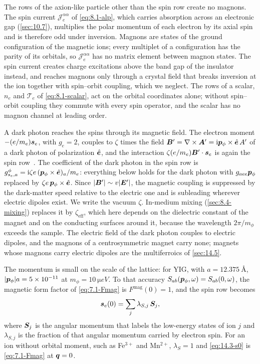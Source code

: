 The rows of the axion-like particle other than the spin row create no magnons. The spin current $\mathcal{J}^{\alpha\alpha}_e$ of \cref{eq:8.1-alp}, which carries absorption across an electronic gap (\cref{sec:10.7}), multiplies the polar momentum of each electron by its axial spin and is therefore odd under inversion. Magnons are states of the ground configuration of the magnetic ions; every multiplet of a configuration has the parity of its orbitals, so $\mathcal{J}^{\alpha\alpha}_e$ has no matrix element between magnon states. The spin current creates charge excitations above the band gap of the insulator instead, and reaches magnons only through a crystal field that breaks inversion at the ion together with spin--orbit coupling, which we neglect. The rows of a scalar, $n_e$ and $\mathcal{T}_e$ of \cref{eq:8.1-scalar}, act on the orbital coordinates alone; without spin--orbit coupling they commute with every spin operator, and the scalar has no magnon channel at leading order.

A dark photon reaches the spins through its magnetic field. The electron moment $-(e/m_e)\bm{s}_e$, with $g_e = 2$, couples to $\zeta$ times the field $\bm{B}' = \nabla\times\bm{A}' = \mathrm{i}\bm{p}_\phi\times\hat{\bm{e}}\,A'$ of a dark photon of polarization $\hat{\bm{e}}$, and the interaction $\zeta(e/m_e)\bm{B}'\cdot\bm{s}_e$ is again the spin row~\cite[Eqs.~(55), (59)]{chigusa2020detecting}. The coefficient of the dark photon in the spin row is $g^\phi_{s_e,a} = \mathrm{i}\zeta e\,(\bm{p}_\phi\times\hat{\bm{e}})_a/m_e$: everything below holds for the dark photon with $g_{aee}\bm{p}_\phi$ replaced by $\zeta e\,\bm{p}_\phi\times\hat{\bm{e}}$. Since $|\bm{B}'| \sim v|\bm{E}'|$, the magnetic coupling is suppressed by the dark-matter speed relative to the electric one and is subleading wherever electric dipoles exist. We write the vacuum $\zeta$. In-medium mixing (\cref{sec:8.4-mixing}) replaces it by $\zeta_{\mathrm{eff}}$, which here depends on the dielectric constant of the magnet and on the conducting surfaces around it, because the wavelength $2\pi/m_\phi$ exceeds the sample. The electric field of the dark photon couples to electric dipoles, and the magnons of a centrosymmetric magnet carry none; magnets whose magnons carry electric dipoles are the multiferroics of \cref{sec:14.5}.

The momentum is small on the scale of the lattice: for YIG, with $a = \SI{12.375}{\angstrom}$, $|\bm{p}_\phi|a = 5\times10^{-11}$ at $m_\phi = \SI{10}{\micro eV}$. To that accuracy $S_{ab}(\bm{p}_\phi,\omega) = S_{ab}(0,\omega)$, the magnetic form factor of \cref{eq:7.1-Fmag} is $F^{\mathrm{mag}}(0) = 1$, and the spin row becomes
\begin{equation}
  \bm{s}_e(0) = \sum_j\lambda_{S,j}\,\bm{S}_j ,
  \label{eq:14.3-s0}
\end{equation}
where $\bm{S}_j$ is the angular momentum that labels the low-energy states of ion $j$ and $\lambda_{S,j}$ is the fraction of that angular momentum carried by electron spin. For an ion without orbital moment, such as Fe$^{3+}$ and Mn$^{2+}$, $\lambda_S = 1$ and \cref{eq:14.3-s0} is \cref{eq:7.1-Fmag} at $\bm{q} = 0$.

